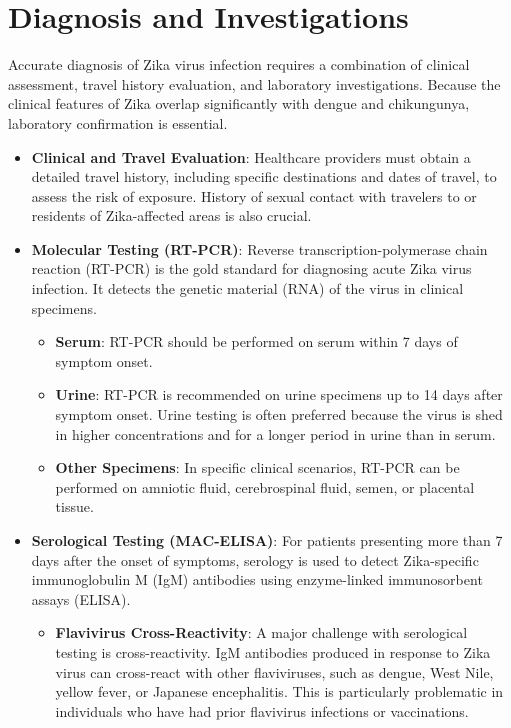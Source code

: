 \section*{Diagnosis and Investigations}
Accurate diagnosis of Zika virus infection requires a combination of clinical assessment, travel history evaluation, and laboratory investigations. Because the clinical features of Zika overlap significantly with dengue and chikungunya, laboratory confirmation is essential.
\begin{itemize}
\item \textbf{Clinical and Travel Evaluation}: Healthcare providers must obtain a detailed travel history, including specific destinations and dates of travel, to assess the risk of exposure. History of sexual contact with travelers to or residents of Zika-affected areas is also crucial.
\item \textbf{Molecular Testing (RT-PCR)}: Reverse transcription-polymerase chain reaction (RT-PCR) is the gold standard for diagnosing acute Zika virus infection. It detects the genetic material (RNA) of the virus in clinical specimens.
  \begin{itemize}
  \item \textbf{Serum}: RT-PCR should be performed on serum within 7 days of symptom onset.
  \item \textbf{Urine}: RT-PCR is recommended on urine specimens up to 14 days after symptom onset. Urine testing is often preferred because the virus is shed in higher concentrations and for a longer period in urine than in serum.
  \item \textbf{Other Specimens}: In specific clinical scenarios, RT-PCR can be performed on amniotic fluid, cerebrospinal fluid, semen, or placental tissue.
  \end{itemize}
\item \textbf{Serological Testing (MAC-ELISA)}: For patients presenting more than 7 days after the onset of symptoms, serology is used to detect Zika-specific immunoglobulin M (IgM) antibodies using enzyme-linked immunosorbent assays (ELISA).
  \begin{itemize}
  \item \textbf{Flavivirus Cross-Reactivity}: A major challenge with serological testing is cross-reactivity. IgM antibodies produced in response to Zika virus can cross-react with other flaviviruses, such as dengue, West Nile, yellow fever, or Japanese encephalitis. This is particularly problematic in individuals who have had prior flavivirus infections or vaccinations.

\end{itemize}
\end{itemize}

